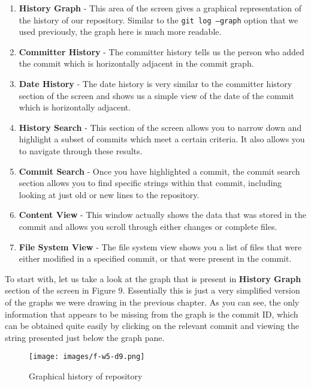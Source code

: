 \begin{enumerate}
\item \textbf{History Graph} - This area of the screen gives a graphical representation of the history of our repository.  Similar to the \texttt{git log --graph} option that we used previously, the graph here is much more readable.
\item \textbf{Committer History} - The committer history tells us the person who added the commit which is horizontally adjacent in the commit graph.  
\item \textbf{Date History} - The date history is very similar to the committer history section of the screen and shows us a simple view of the date of the commit which is horizontally adjacent.
\item \textbf{History Search} - This section of the screen allows you to narrow down and highlight a subset of commits which meet a certain criteria.  It also allows you to navigate through these results.
\item \textbf{Commit Search} - Once you have highlighted a commit, the commit search section allows you to find specific strings within that commit, including looking at just old or new lines to the repository.
\item \textbf{Content View} - This window actually shows the data that was stored in the commit and allows you scroll through either changes or complete files.
\item \textbf{File System View} - The file system view shows you a list of files that were either modified in a specified commit, or that were present in the commit.
\end{enumerate}

To start with, let us take a look at the graph that is present in \textbf{History Graph} section of the screen in Figure 9.  Essentially this is just a very simplified version of the graphs we were drawing in the previous chapter.  As you can see, the only information that appears to be missing from the graph is the commit ID, which can be obtained quite easily by clicking on the relevant commit and viewing the string presented just below the graph pane.

\begin{figure}[hbt]
\centering
\texttt{[image: images/f-w5-d9.png]}
\caption{Graphical history of repository}
\end{figure} 

